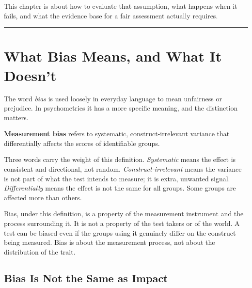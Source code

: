 \documentclass[
  11pt,
  letterpaper,
]{scrbook}
\begin{document}
This chapter is about how to evaluate that assumption, what happens when
it fails, and what the evidence base for a fair assessment actually
requires.

\begin{center}\rule{0.5\linewidth}{0.5pt}\end{center}

\section{What Bias Means, and What It
Doesn't}\label{what-bias-means-and-what-it-doesnt}

The word \emph{bias} is used loosely in everyday language to mean
unfairness or prejudice. In psychometrics it has a more specific
meaning, and the distinction matters.

\begin{tcolorbox}[enhanced jigsaw, colback=white, toprule=.15mm, colbacktitle=quarto-callout-note-color!10!white, left=2mm, leftrule=.75mm, opacitybacktitle=0.6, colframe=quarto-callout-note-color-frame, rightrule=.15mm, bottomtitle=1mm, opacityback=0, titlerule=0mm, toptitle=1mm, breakable, bottomrule=.15mm, coltitle=black, title=\textcolor{quarto-callout-note-color}{\faInfo}\hspace{0.5em}{Note}, arc=.35mm]

\textbf{Measurement bias} refers to systematic, construct-irrelevant
variance that differentially affects the scores of identifiable groups.

\end{tcolorbox}

Three words carry the weight of this definition. \emph{Systematic} means
the effect is consistent and directional, not random.
\emph{Construct-irrelevant} means the variance is not part of what the
test intends to measure; it is extra, unwanted signal.
\emph{Differentially} means the effect is not the same for all groups.
Some groups are affected more than others.

Bias, under this definition, is a property of the measurement instrument
and the process surrounding it. It is not a property of the test takers
or of the world. A test can be biased even if the groups using it
genuinely differ on the construct being measured. Bias is about the
measurement process, not about the distribution of the trait.

\subsection{Bias Is Not the Same as
Impact}\label{bias-is-not-the-same-as-impact}
\end{document}
